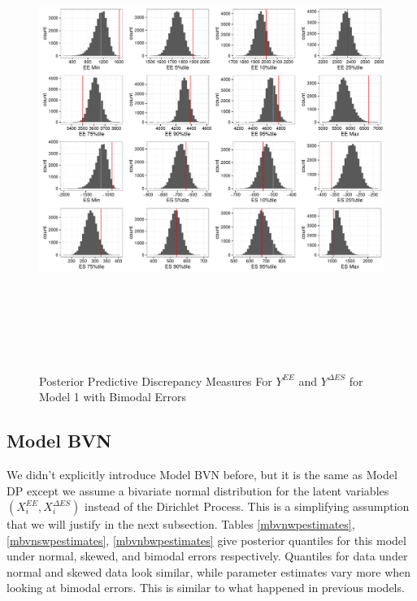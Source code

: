 \documentclass[11pt]{article}\usepackage[]{graphicx}\usepackage[]{color}
\begin{document}
  \begin{figure}
  \centering
  \includegraphics[width=17cm,height=15cm]{manual_figure/wpydiag1b.pdf}
  \caption{Posterior Predictive Discrepancy Measures For $Y^{EE}$ and $Y^{\Delta ES}$ for Model 1 with Bimodal Errors}
  \label{wpydiag1b}
  \end{figure}
\subsection{Model BVN}
% 
We didn't explicitly introduce Model BVN before, but it is the same as Model DP except we assume a bivariate normal distribution for the latent variables $(X_i^{EE},X_i^{\Delta ES})$ instead of the Dirichlet Process. This is a simplifying assumption that we will justify in the next subsection. Tables \ref{mbvnwpestimates}, \ref{mbvnswpestimates}, \ref{mbvnbwpestimates} give posterior quantiles for this model under normal, skewed, and bimodal errors respectively. Quantiles for data under normal and skewed data look similar, while parameter estimates vary more when looking at bimodal errors. This is similar to what happened in previous models. 
\end{document}
